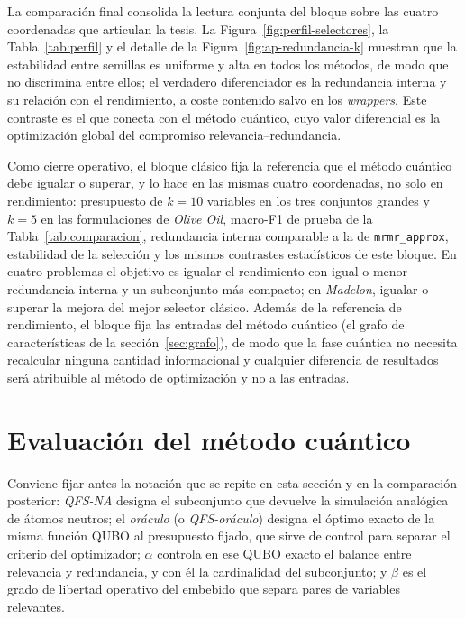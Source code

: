 La comparación final consolida la lectura conjunta del bloque sobre las
cuatro coordenadas que articulan la tesis. La
Figura~\ref{fig:perfil-selectores}, la Tabla~\ref{tab:perfil} y el
detalle de la Figura~\ref{fig:ap-redundancia-k} muestran que la estabilidad entre semillas es
uniforme y alta en todos los métodos, de modo que no discrimina entre
ellos; el verdadero diferenciador es la redundancia interna y su relación
con el rendimiento, a coste contenido salvo en los \textit{wrappers}.
Este contraste es el que conecta con el método cuántico, cuyo valor
diferencial es la optimización global del compromiso
relevancia--redundancia.

Como cierre operativo, el bloque clásico fija la referencia que el método
cuántico debe igualar o superar, y lo hace en las mismas cuatro
coordenadas, no solo en rendimiento: presupuesto de $k=10$ variables en
los tres conjuntos grandes y $k=5$ en las formulaciones de
\textit{Olive Oil}, macro-F1 de prueba de la Tabla~\ref{tab:comparacion},
redundancia interna comparable a la de \texttt{mrmr\_approx},
estabilidad de la selección y los mismos contrastes estadísticos de este
bloque. En cuatro problemas el objetivo es igualar el rendimiento con
igual o menor redundancia interna y un subconjunto más compacto; en
\textit{Madelon}, igualar o superar la mejora del mejor selector
clásico. Además de la
referencia de rendimiento, el bloque fija las entradas del método
cuántico (el grafo de características de la sección~\ref{sec:grafo}),
de modo que la fase cuántica no necesita recalcular ninguna cantidad
informacional y cualquier diferencia de resultados será atribuible al
método de optimización y no a las entradas.

\section{Evaluación del método cuántico}
\label{sec:res-cuantico}

Conviene fijar antes la notación que se repite en esta sección y en la
comparación posterior: \emph{QFS-NA} designa el subconjunto que devuelve
la simulación analógica de átomos neutros; el \emph{oráculo} (o
\emph{QFS-oráculo}) designa el óptimo exacto de la misma función QUBO al
presupuesto fijado, que sirve de control para separar el criterio del
optimizador; $\alpha$ controla en ese QUBO exacto el balance entre
relevancia y redundancia, y con él la cardinalidad del subconjunto; y
$\beta$ es el grado de libertad operativo del embebido que separa pares
de variables relevantes.

